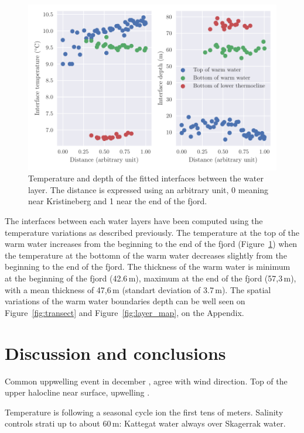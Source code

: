 \documentclass[12pt,a4paper]{article}
\begin{document}
\begin{figure}[h]
  \centering
  \includegraphics{layers}
  \caption{\label{fig:layers}Temperature and depth of the fitted interfaces
    between the water layer. The distance is expressed using an arbitrary unit,
    0 meaning near Kristineberg and 1 near the end of the fjord.}
\end{figure}
The interfaces between each water layers have been computed using
the temperature variations as described previously.
The temperature at the top of the warm water
increases from the beginning to the end of the fjord (Figure~\ref{fig:layers}) when
the temperature at the bottomn of the warm water
decreases slightly from the beginning to the end of the fjord.
The thickness of the warm water is minimum at the beginning of the fjord (42.6\,m),
maximum at the end of the fjord (57,3\,m), with a mean thickness of 47,6\,m
(standart deviation of 3.7\,m).
The spatial variations of the warm water boundaries depth can be
well seen on
Figure~\ref{fig:transect} and Figure~\ref{fig:layer_map}, on the Appendix.


\section{Discussion and conclusions}


Common uppwelling event in december \citep{bjork2003},
agree with wind direction.
Top of the upper halocline near surface, upwelling \citep{arneborg2003}.

Temperature is following a seasonal cycle ion the first tens of meters.
Salinity controls strati up to about 60\,m: Kattegat water always over Skagerrak
water.
\end{document}
